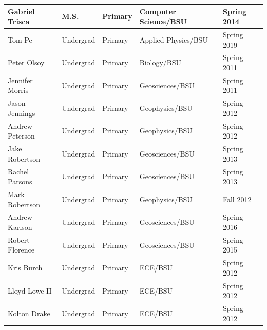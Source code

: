 \documentclass[11pt]{article}
\begin{document}
\begin{table}[!htbp]
\begin{tabular}{|l|l|l|l|l|}
Gabriel Trisca & M.S. & Primary & Computer Science/BSU & Spring 2014 \\ \hline
Tom Pe & Undergrad & Primary & Applied Physics/BSU & Spring 2019 \\ \hline
Peter Olsoy & Undergrad & Primary & Biology/BSU & Spring 2011 \\ \hline
Jennifer Morris & Undergrad & Primary & Geosciences/BSU & Spring 2011 \\ \hline
Jason Jennings & Undergrad & Primary & Geophysics/BSU & Spring 2012 \\ \hline
Andrew Peterson & Undergrad & Primary & Geophysics/BSU & Spring 2012 \\ \hline
Jake Robertson & Undergrad & Primary & Geosciences/BSU & Spring 2013 \\ \hline
Rachel Parsons & Undergrad & Primary & Geosciences/BSU & Spring 2013 \\ \hline
Mark Robertson & Undergrad & Primary & Geophysics/BSU & Fall 2012 \\ \hline
Andrew Karlson & Undergrad & Primary & Geosciences/BSU & Spring 2016 \\ \hline
Robert Florence & Undergrad & Primary & Geosciences/BSU & Spring 2015 \\ \hline
Kris Burch & Undergrad & Primary & ECE/BSU & Spring 2012 \\ \hline
Lloyd Lowe II & Undergrad & Primary & ECE/BSU & Spring 2012 \\ \hline
Kolton Drake & Undergrad & Primary & ECE/BSU & Spring 2012 \\ \hline
\end{tabular}
\end{table}
\end{document}
